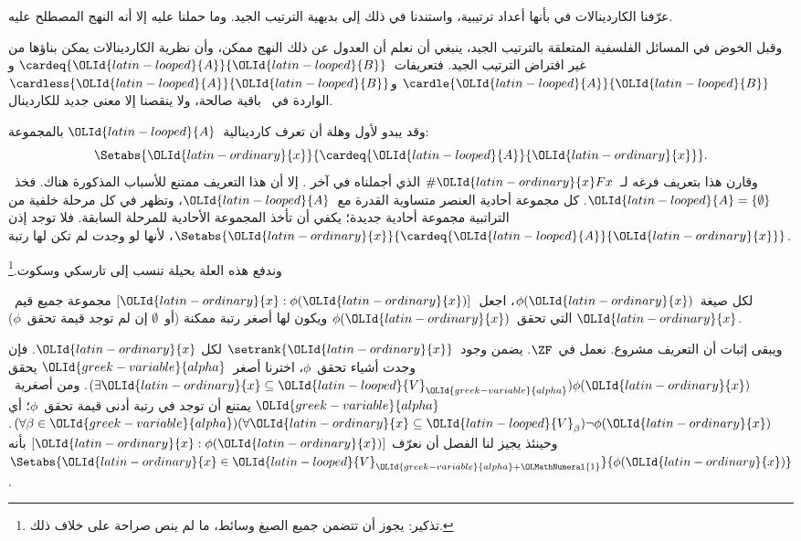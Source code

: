 \documentclass[../../../include/open-logic-section]{subfiles}
\begin{document}

عرّفنا الكاردينالات في
 بأنها أعداد
ترتيبية، واستندنا في ذلك إلى بديهية الترتيب الجيد. وما حملنا عليه إلا
أنه النهج المصطلح عليه.

وقبل الخوض في المسائل الفلسفية المتعلقة بالترتيب الجيد، ينبغي أن نعلم
أن العدول عن ذلك النهج ممكن، وأن نظرية الكاردينالات يمكن بناؤها من غير
افتراض الترتيب الجيد. فتعريفات~$\cardeq{{\OLId{latin-looped}{A}}}{{\OLId{latin-looped}{B}}}$ و$\cardle{{\OLId{latin-looped}{A}}}{{\OLId{latin-looped}{B}}}$
و$\cardless{{\OLId{latin-looped}{A}}}{{\OLId{latin-looped}{B}}}$ الواردة في~ باقية صالحة،
ولا ينقصنا إلا معنى جديد للكاردينال.

وقد يبدو لأول وهلة أن تعرف كاردينالية~${\OLId{latin-looped}{A}}$ بالمجموعة:
\[
	\Setabs{{\OLId{latin-ordinary}{x}}}{\cardeq{{\OLId{latin-looped}{A}}}{{\OLId{latin-ordinary}{x}}}}.
\]
وقارن هذا بتعريف فرغه لـ~$\# {\OLId{latin-ordinary}{x}} Fx$ الذي أجملناه في آخر
. إلا أن هذا التعريف ممتنع للأسباب المذكورة
هناك. فخذ~${\OLId{latin-looped}{A}}=\{\emptyset\}$. كل مجموعة أحادية العنصر متساوية القدرة
مع~${\OLId{latin-looped}{A}}$، وتظهر في كل مرحلة خلفية من التراتبية مجموعة أحادية جديدة؛
يكفي أن تأخذ المجموعة الأحادية للمرحلة السابقة. فلا توجد إذن
$\Setabs{{\OLId{latin-ordinary}{x}}}{\cardeq{{\OLId{latin-looped}{A}}}{{\OLId{latin-ordinary}{x}}}}$، لأنها لو وجدت لم تكن لها رتبة.

وندفع هذه العلة بحيلة تنسب إلى تارسكي وسكوت.\footnote{تذكير: يجوز أن
تتضمن جميع الصيغ وسائط، ما لم ينص صراحة على خلاف ذلك.}

\begin{defn}
لكل صيغة~$\phi({\OLId{latin-ordinary}{x}})$، اجعل~$[ {\OLId{latin-ordinary}{x}} : \phi({\OLId{latin-ordinary}{x}})] $ مجموعة جميع قيم~${\OLId{latin-ordinary}{x}}$ التي
تحقق~$\phi({\OLId{latin-ordinary}{x}})$ ويكون لها أصغر رتبة ممكنة (أو~$\emptyset$ إن لم توجد
قيمة تحقق~$\phi$).
\end{defn}

ويبقى إثبات أن التعريف مشروع. نعمل في~$\ZF$. يضمن
 وجود~$\setrank{{\OLId{latin-ordinary}{x}}}$ لكل
${\OLId{latin-ordinary}{x}}$. فإن وجدت أشياء تحقق~$\phi$، اخترنا أصغر~${\OLId{greek-variable}{alpha}}$ يحقق
$(\exists {\OLId{latin-ordinary}{x}}\subseteq {\OLId{latin-looped}{V}}_{\OLId{greek-variable}{alpha}})\phi({\OLId{latin-ordinary}{x}})$. ومن أصغرية~${\OLId{greek-variable}{alpha}}$ يمتنع أن
توجد في رتبة أدنى قيمة تحقق~$\phi$؛ أي
$(\forall \beta \in {\OLId{greek-variable}{alpha}})(\forall {\OLId{latin-ordinary}{x}} \subseteq {\OLId{latin-looped}{V}}_\beta)
\lnot \phi({\OLId{latin-ordinary}{x}})$. وحينئذ يجيز لنا الفصل أن نعرّف
$[{\OLId{latin-ordinary}{x}} : \phi({\OLId{latin-ordinary}{x}})]$ بأنه~$\Setabs{{\OLId{latin-ordinary}{x}} \in {\OLId{latin-looped}{V}}_{{\OLId{greek-variable}{alpha}}+{\OLMathNumeral{1}}}}{\phi({\OLId{latin-ordinary}{x}})}$.
\end{document}
